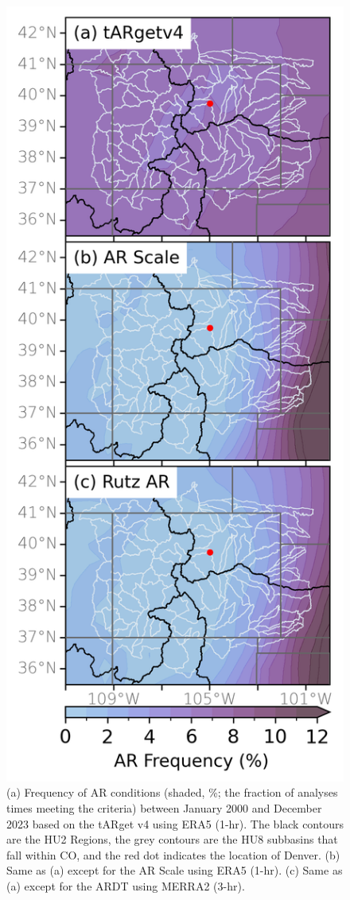 \documentclass[draft]{agujournal2019}
\begin{document}
\begin{figure}
\noindent\includegraphics[width=\textwidth, height=\textheight, keepaspectratio]{fig2.png}
\caption{(a) Frequency of AR conditions (shaded, \%; the fraction of analyses times meeting the criteria) between January 2000 and December 2023 based on the  tARget v4 using ERA5 (1-hr). The black contours are the HU2 Regions, the grey contours are the HU8 subbasins that fall within CO, and the red dot indicates the location of Denver. (b) Same as (a) except for the AR Scale \cite{MartinRalph2019} using ERA5 (1-hr). (c) Same as (a) except for the  ARDT using MERRA2 (3-hr). }
\label{fig:ar_overhead}
\end{figure}
\end{document}
